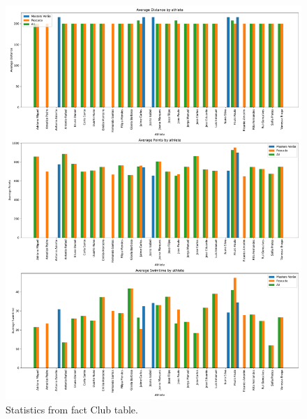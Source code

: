 \begin{figure}[H]
    \centering
    \includegraphics[width=\textwidth]{img/athletefact.pdf}
    \caption{Statistics from fact Club table.}
    \label{fig:athlete_fact}
\end{figure}